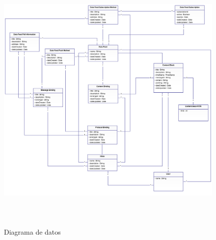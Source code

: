 	\begin{figure}[ht!]
	\centering
	\includegraphics[width=5.7638in,height=5.3126in]{Diseno21-img/Diseno21-img004.png} 
	\caption{Diagrama de datos}
	\label{fig.diagramadedatos}
	\end{figure}
	\bigskip
	
